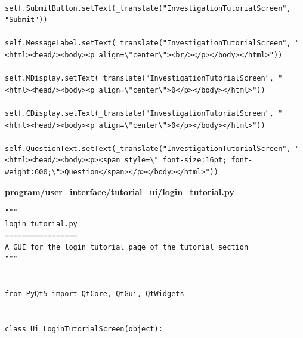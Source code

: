 \documentclass[12pt]{article}
\begin{document}
\begin{lstlisting}
        self.SubmitButton.setText(_translate("InvestigationTutorialScreen", "Submit"))
        self.MessageLabel.setText(_translate("InvestigationTutorialScreen", "<html><head/><body><p align=\"center\"><br/></p></body></html>"))
        self.MDisplay.setText(_translate("InvestigationTutorialScreen", "<html><head/><body><p align=\"center\">0</p></body></html>"))
        self.CDisplay.setText(_translate("InvestigationTutorialScreen", "<html><head/><body><p align=\"center\">0</p></body></html>"))
        self.QuestionText.setText(_translate("InvestigationTutorialScreen", "<html><head/><body><p><span style=\" font-size:16pt; font-weight:600;\">Question</span></p></body></html>"))
\end{lstlisting}

\textbf{program/user\_interface/tutorial\_ui/login\_tutorial.py}
\begin{lstlisting}
"""
login_tutorial.py
=================
A GUI for the login tutorial page of the tutorial section
"""


from PyQt5 import QtCore, QtGui, QtWidgets


class Ui_LoginTutorialScreen(object):


\end{lstlisting}
\end{document}
